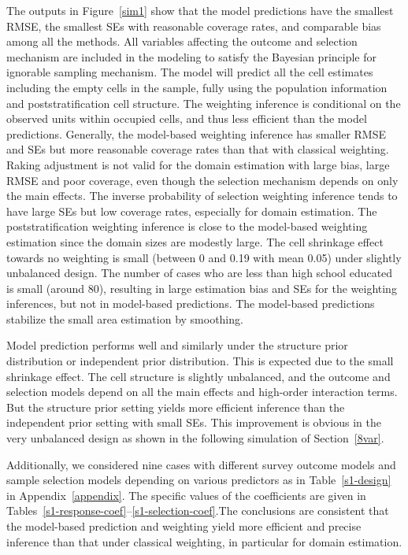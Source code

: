 \documentclass[11pt]{article}
\begin{document}
The outputs in Figure~\ref{sim1} show that the model predictions have the smallest RMSE, the smallest SEs with reasonable coverage rates, and comparable bias among all the methods. All variables affecting the outcome and selection mechanism are included in the modeling to satisfy the Bayesian principle for ignorable sampling mechanism. The model will predict all the cell estimates including the empty cells in the sample, fully using the population information and poststratification cell structure. The weighting inference is conditional on the observed units within occupied cells, and thus less efficient than the model predictions. Generally, the model-based weighting inference has smaller RMSE and SEs but more reasonable coverage rates than that with classical weighting. Raking adjustment is not valid for the domain estimation with large bias, large RMSE and poor coverage, even though the selection mechanism depends on only the main effects. The inverse probability of selection weighting inference tends to have large SEs but low coverage rates, especially for domain estimation. The poststratification weighting inference is close to the model-based weighting estimation since the domain sizes are modestly large. The cell shrinkage effect towards no weighting is small (between 0 and 0.19 with mean 0.05) under slightly unbalanced design. The number of cases who are less than high school educated is small (around 80), resulting in large estimation bias and SEs for the weighting inferences, but not in model-based predictions. The model-based predictions stabilize the small area estimation by smoothing.

Model prediction performs well and similarly under the structure prior distribution or independent prior distribution. This is expected due to the small shrinkage effect. The cell structure is slightly unbalanced, and the outcome and selection models depend on all the main effects and high-order interaction terms. But the structure prior setting yields more efficient inference than the independent prior setting with small SEs. This improvement is obvious in the very unbalanced design as shown in the following simulation of Section~\ref{8var}.

Additionally, we considered nine cases with different survey outcome models and sample selection models depending on various predictors as in Table~\ref{s1-design} in Appendix~\ref{appendix}. The specific values of the coefficients are given in Tables~\ref{s1-response-coef}--\ref{s1-selection-coef}.The conclusions are consistent that the model-based prediction and weighting yield more efficient and precise inference than that under classical weighting, in particular for domain estimation.
\end{document}
